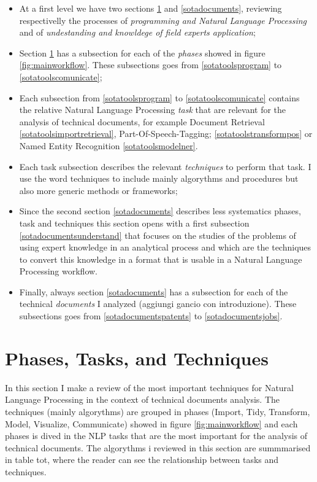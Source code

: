 \documentclass[]{book}
\providecommand{\tightlist}{%
  \setlength{\itemsep}{0pt}\setlength{\parskip}{0pt}}
\begin{document}
\begin{itemize}
\tightlist
\item
  At a first level we have two sections \ref{sotatools} and
  \ref{sotadocuments}, reviewing respectivelly the processes of
  \emph{programming and Natural Language Processing} and of
  \emph{undestanding and knowldege of field experts application};
\item
  Section \ref{sotatools} has a subsection for each of the \emph{phases}
  showed in figure \ref{fig:mainworkflow}. These subsections goes from
  \ref{sotatoolsprogram} to \ref{sotatoolscomunicate};
\item
  Each subsection from \ref{sotatoolsprogram} to
  \ref{sotatoolscomunicate} contains the relative Natural Language
  Processing \emph{task} that are relevant for the analysis of technical
  documents, for example Document Retrieval
  \ref{sotatoolsimportretrieval}, Part-Of-Speech-Tagging;
  \ref{sotatoolstransformpos} or Named Entity Recognition
  \ref{sotatoolsmodelner}.
\item
  Each task subsection describes the relevant \emph{techniques} to
  perform that task. I use the word techniques to include mainly
  algorythms and procedures but also more generic methods or frameworks;
\item
  Since the second section \ref{sotadocuments} describes less
  systematics phases, task and techniques this section opens with a
  first subsection \ref{sotadocumentsunderstand} that focuses on the
  studies of the problems of using expert knowledge in an analytical
  process and which are the techniques to convert this knowledge in a
  format that is usable in a Natural Language Processing workflow.
\item
  Finally, always section \ref{sotadocuments} has a subsection for each
  of the technical \emph{documents} I analyzed (aggiungi gancio con
  introduzione). These subsections goes from \ref{sotadocumentspatents}
  to \ref{sotadocumentsjobs}.
\end{itemize}

\section{Phases, Tasks, and Techniques}\label{sotatools}

In this section I make a review of the most important techniques for
Natural Language Processing in the context of technical documents
analysis. The techniques (mainly algorythms) are grouped in phases
(Import, Tidy, Transform, Model, Visualize, Communicate) showed in
figure \ref{fig:mainworkflow} and each phases is dived in the NLP tasks
that are the most important for the analysis of technical documents. The
algorythms i reviewed in this section are summmarised in table tot,
where the reader can see the relationship between tasks and techniques.
\end{document}
